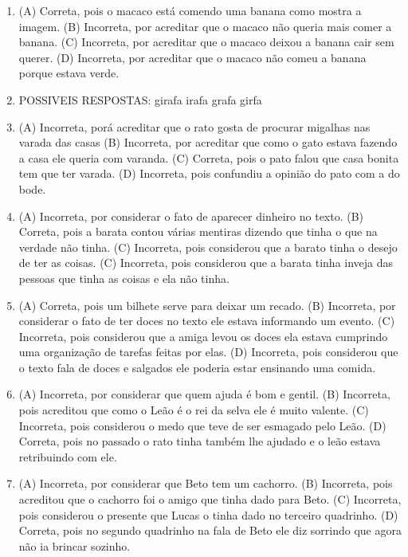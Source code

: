\begin{enumerate}
\item
(A) Correta, pois o macaco está comendo uma banana como mostra a imagem.
(B) Incorreta, por acreditar que o macaco não queria mais comer a banana.
(C) Incorreta, por acreditar que o macaco deixou a banana cair sem querer.
(D) Incorreta, por acreditar que o macaco não comeu a banana porque estava verde.

\item
POSSIVEIS RESPOSTAS:
girafa
irafa
grafa
girfa

\item
(A) Incorreta, porá acreditar que o rato gosta de procurar migalhas nas
varada das casas
(B) Incorreta, por acreditar que como o gato estava fazendo a casa ele
queria com varanda.
(C) Correta, pois o pato falou que casa bonita tem que ter varada.
(D) Incorreta, pois confundiu a opinião do pato com a do bode.

\item
(A) Incorreta, por considerar o fato de aparecer dinheiro no texto.
(B) Correta, pois a barata contou várias mentiras dizendo que tinha o
que na verdade não tinha.
(C) Incorreta, pois considerou que a barato tinha o desejo de ter as
coisas.
(C) Incorreta, pois considerou que a barata tinha inveja das pessoas que
tinha as coisas e ela não tinha.

\item
(A) Correta, pois um bilhete serve para deixar um recado.
(B) Incorreta, por considerar o fato de ter doces no texto ele estava
informando um evento.
(C) Incorreta, pois considerou que a amiga levou os doces ela estava
cumprindo uma organização de tarefas feitas por elas.
(D) Incorreta, pois considerou que o texto fala de doces e salgados ele
poderia estar ensinando uma
comida.

\item
(A) Incorreta, por considerar que quem ajuda é bom e gentil.
(B) Incorreta, pois acreditou que como o Leão é o rei da selva ele é
muito valente.
(C) Incorreta, pois considerou o medo que teve de ser esmagado pelo
Leão.
(D) Correta, pois no passado o rato tinha também lhe ajudado e o leão
estava retribuindo com ele.

\item
(A) Incorreta, por considerar que Beto tem um cachorro.
(B) Incorreta, pois acreditou que o cachorro foi o amigo que tinha dado
para Beto.
(C) Incorreta, pois considerou o presente que Lucas o tinha dado no
terceiro quadrinho.
(D) Correta, pois no segundo quadrinho na fala de Beto ele diz sorrindo
que agora não ia brincar sozinho.
\end{enumerate}

